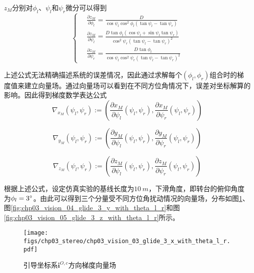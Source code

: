 $z_M$分别对$\phi_l$、$\psi_l$和$\psi_r$微分可以得到
\begin{equation}
\left\{ \,
\begin{aligned}
&\frac{ \partial z_M}{ \partial \phi_l} = \frac{D}{ \cos \psi_l \cos^2 \phi_l (\tan \psi_l - \tan \psi_r)} \\
&\frac{\partial z_M}{\partial \psi_l} = \frac{ D \tan \phi_l(\cos \psi_l + \sin \psi_l \tan \psi_r)}{ \cos^2 \psi_r (\tan \psi_l - \tan \psi_r)^2} \\
&\frac{ \partial z_M}{ \partial \psi_r} = \frac{ D \tan \phi_l}{ \cos \psi_l \cos^2 \psi_r (\tan \psi_l - \tan \psi_r)^2}
\end{aligned}
\right.
\end{equation} 

上述公式无法精确描述系统的误差情况，因此通过求解每个$(\phi_l, \phi_r)$组合时的梯度值来建立向量场。通过向量场可以看到在不同方位角情况下，误差对坐标解算的影响。因此得到梯度数学表达公式
\begin{equation}
\nabla_{x_M}(\psi_l, \psi_r):=\left( \frac{\partial x_M}{\partial \psi_l}(\psi_l, \psi_r), \frac{\partial x_M}{\partial \psi_r}(\psi_l, \psi_r)  \right)
\end{equation}

\begin{equation}
\nabla_{y_M}(\psi_l, \psi_r):=\left( \frac{\partial y_M}{\partial \psi_l}(\psi_l, \psi_r), \frac{\partial y_M}{\partial \psi_r}(\psi_l, \psi_r)  \right)
\end{equation}

\begin{equation}
\nabla_{z_M}(\psi_l, \psi_r):=\left( \frac{\partial z_M}{\partial \psi_l}(\psi_l, \psi_r), \frac{\partial z_M}{\partial \psi_r}(\psi_l, \psi_r)  \right)
\end{equation}

根据上述公式，设定仿真实验的基线长度为$10\ m$，下滑角度，即转台的俯仰角度为$\phi_l=3\degree$。由此可以得到三个分量受不同方位角扰动情况的向量场，分布如图\ref{fig:chp03_vision_03_glide_3_x_with_theta_l_r}、图\ref{fig:chp03_vision_04_glide_3_y_with_theta_l_r}和图\ref{fig:chp03_vision_05_glide_3_z_with_theta_l_r}所示。

\begin{figure}[!tb]
	\centering
	\texttt{[image: figs/chp03\_stereo/chp03\_vision\_03\_glide\_3\_x\_with\_theta\_l\_r.pdf]}	
	\caption{引导坐标系$\mathbf{i}^{O,c}$方向梯度向量场}
	\label{fig:chp03_vision_03_glide_3_x_with_theta_l_r}
\end{figure}


